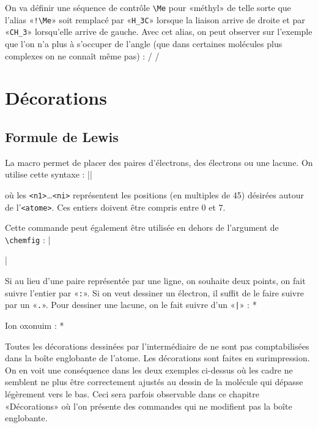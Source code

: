 \documentclass[10pt,french]{article}
\makeatletter
\newcommand\make@car@active[1]{%
	\catcode`#1\active
	\begingroup
		\lccode`\~`#1\relax
		\lowercase{\endgroup\def~}%
}
\newif\if@exstar
\newcommand\exemple{%
	\begingroup
	\parskip\z@
	\@makeother\;\@makeother\!\@makeother\?\@makeother\:%
	\@ifstar{\@exstartrue\exemple@}{\@exstarfalse\exemple@}}
\newcommand\exemple@[2][65]{%
	\medbreak\noindent
	\begingroup
		\let\do\@makeother\dospecials
		\make@car@active\ { {}}%
		\make@car@active\^^M{\par\leavevmode}%
		\make@car@active\^^I{\space\space}%
		\make@car@active\,{\leavevmode\kern\z@\string,}%
		\make@car@active\-{\leavevmode\kern\z@\string-}%
		\make@car@active\>{\leavevmode\kern\z@\string>}%
		\make@car@active\<{\leavevmode\kern\z@\string<}%
		\exemple@@{#1}{#2}%
}
\newcommand\exemple@@[3]{%
	\def\@tempa##1#3{\exemple@@@{#1}{#2}{##1}}%
	\@tempa
}
\newcommand\exemple@@@[3]{%
	\xdef\the@code{#3}%
	\endgroup
	\if@exstar
		\begingroup
			\fboxrule0.4pt
			\let\breakboxparindent\z@
			\def\bkvz@bottom{\hrule\@height\fboxrule}%
			\let\bkvz@before@breakbox\relax
			\def\bkvz@set@linewidth{\advance\linewidth\dimexpr-2\fboxrule-2\fboxsep}%
			\def\bkvz@left{\vrule\@width\fboxrule\hskip\fboxsep}%
			\def\bkvz@right{\hskip\fboxsep\vrule\@width\fboxrule}%
			\def\bkvz@top{\hbox to \hsize{%
				\vrule\@width\fboxrule\@height\fboxrule
				\leaders\bkvz@bottom\hfill
				\sffamily
				\fboxsep\z@
				\colorbox{black}{\kern0.25em\color{white}\footnotesize\lower0.5ex\hbox{\strut#2}\kern0.25em}%
				\leaders\bkvz@bottom\hfill
				\vrule\@width\fboxrule\@height\fboxrule}}%
			\breakbox
				\kern.5ex\relax
				\ttfamily\footnotesize\the@code\par
				\normalfont
				\kern3pt
				\hrule height0.1pt width\linewidth depth0.1pt
				\vskip5pt
				\rightskip0pt plus 1fill
				\everypar{{\color{lightgray}\rlap{\vrule height0.1pt width\linewidth depth0.1pt}}\hskip0pt plus 1fill}%
				\newlinechar`\^^M\everyeof{\noexpand}\scantokens{#3}\par
			\endbreakbox
		\endgroup
	\else
		\vskip0.5ex
		\boxput*(0,1)
			{\fboxsep\z@
			\hbox{\sffamily\colorbox{black}{\leavevmode\kern0.25em{\color{white}\footnotesize\strut#2}\kern0.25em}}%
			}%
			{\fboxsep5pt
			\fbox{%
				$\vcenter{\hsize\dimexpr0.#1\linewidth-\fboxsep-\fboxrule\relax
					\kern5pt\parskip0pt \ttfamily\footnotesize\the@code}%
				\vcenter{\kern5pt\hsize\dimexpr\linewidth-0.#1\linewidth-\fboxsep-\fboxrule\relax
					\everypar{{\color{lightgray}\rlap{\vrule height0.1pt width\dimexpr\linewidth-0.#1\linewidth-\fboxsep-\fboxrule depth0.1pt}}}%
					\footnotesize\newlinechar`\^^M\everyeof{\noexpand}\scantokens{#3}}$%
				}%
			}%
	\fi
	\medbreak
	\endgroup
}
\newcommand\falseverb[1]{{\ttfamily\detokenize\expandafter{\string#1}}}
\let\do\@makeother\dospecials
\makeatother
\begin{document}
On va définir une séquence de contrôle \verb-\Me- pour «méthyl» de telle sorte que l'alias «\verb-!\Me-» soit remplacé par «\verb-H_3C-» lorsque la liaison arrive de droite et par «\verb-CH_3-» lorsqu'elle arrive de gauche. Avec cet alias, on peut observer sur l'exemple que l'on n'a plus à s'occuper de l'angle (que dans certaines molécules plus complexes on ne connaît même pas) :
\exemple{Alias dual}/
/

\section{Décorations}
\subsection{Formule de Lewis}\label{lewis}
La macro \falseverb{\lewis} permet de placer des paires d'électrons, des électrons ou une lacune. On utilise cette syntaxe :
\centerverb||
\smallskip

où les \verb-<n1>-\ldots\verb-<ni>- représentent les positions (en multiples de 45\degres) désirées autour de l'\verb-<atome>-. Ces entiers doivent être compris entre 0 et 7.

Cette commande peut également être utilisée en dehors de l'argument de \verb-\chemfig- :
\exemple{La macro \string\lewis}|\par\medskip
{}\par\medskip
{}|

Si au lieu d'une paire représentée par une ligne, on souhaite deux points, on fait suivre l'entier par «\verb-:-». Si on veut dessiner un électron, il suffit de le faire suivre par un «\verb-.-». Pour dessiner une lacune, on le fait suivre d'un «\verb-|-» :
\exemple{Décorations de Lewis}*\qquad{}\par\bigskip
{}\qquad{}\par\bigskip
{}\par\bigskip
Ion oxonuim : *

Toutes les décorations dessinées par l'intermédiaire de \falseverb{\lewis} ne sont pas comptabilisées dans la boîte englobante de l'atome. Les décorations sont faites en surimpression. On en voit une conséquence dans les deux exemples ci-dessus où les cadre ne semblent ne plus être correctement ajustés au dessin de la molécule qui dépasse légèrement vers le bas. Ceci sera parfois observable dans ce chapitre «Décorations» où l'on présente des commandes qui ne modifient pas la boîte englobante.
\end{document}
